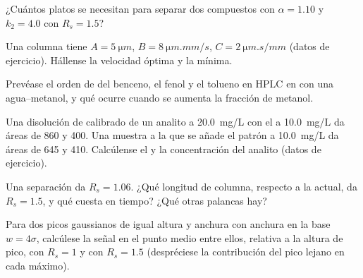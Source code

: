 \begin{exercise}[$\star\star$]\label{exo:b2:chromatography:6}
¿Cuántos platos se necesitan para separar dos compuestos con $\alpha = 1.10$ y $k_2 = 4.0$ con
$R_s = 1.5$?
\end{exercise}

\begin{exercise}[$\star\star$]\label{exo:b2:chromatography:7}
Una columna tiene $A = \qty{5}{\micro m}$, $B = \qty{8}{\micro m.mm/s}$, $C = \qty{2}{\micro m.s/mm}$
(datos de ejercicio). Hállense la velocidad óptima y la  mínima.
\end{exercise}

\begin{exercise}[$\star\star$]\label{exo:b2:chromatography:8}
Prevéase el orden de  del benceno, el fenol y el tolueno en HPLC en  con una
 agua--metanol, y qué ocurre cuando se aumenta la fracción de metanol.
\end{exercise}

\begin{exercise}[$\star\star$]\label{exo:b2:chromatography:9}
Una disolución de calibrado de un analito a \qty{20.0}{mg/L} con el  a \qty{10.0}{mg/L}
da áreas de 860 y 400. Una muestra a la que se añade el patrón a \qty{10.0}{mg/L} da áreas de 645 y 410.
Calcúlense el  y la concentración del analito (datos de ejercicio).
\end{exercise}

\begin{exercise}[$\star\star\star$]\label{exo:b2:chromatography:10}
Una separación da $R_s = 1.06$. ¿Qué longitud de columna, respecto a la actual, da $R_s = 1.5$, y
qué cuesta en tiempo? ¿Qué otras palancas hay?
\end{exercise}

\begin{exercise}[$\star\star\star$]\label{exo:b2:chromatography:11}
Para dos picos gaussianos de igual altura y anchura con anchura en la base $w = 4\sigma$, calcúlese la señal
en el punto medio entre ellos, relativa a la altura de pico, con $R_s = 1$ y con $R_s = 1.5$ (despréciese la contribución
del pico lejano en cada máximo).
\end{exercise}

